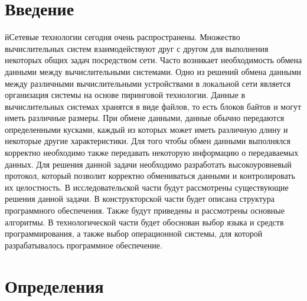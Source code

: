 \section*{Введение}
йСетевые технологии сегодня очень распространены. Множество
вычислительных систем взаимодействуют друг с другом для выполнения
некоторых общих задач посредством сети. Часто возникает необходимость
обмена данными между вычислительными системами. Одно из решений
обмена данными между различными вычислительными устройствами в
локальной сети является организация системы на основе пиринговой
технологии.
\newpar
Данные в вычислительных системах хранятся в виде файлов, то есть блоков
байтов и могут иметь различные размеры. При обмене данными, данные
обычно передаются определенными кусками, каждый из которых может
иметь различную длину и некоторые другие характеристики. Для того чтобы
обмен данными выполнялся корректно необходимо также передавать
некоторую информацию о передаваемых данных. Для решения данной задачи
необходимо разработать высокоуровневый протокол, который позволит
корректно обмениваться данными и контролировать их целостность.
\newpar
В исследовательской части будут рассмотрены существующие решения
данной задачи.
\newpar
В конструкторской части будет описана структура программного
обеспечения. Также будут приведены и рассмотрены основные алгоритмы.
\newpar
В технологической части будет обоснован выбор языка и средств
программирования, а также выбор операционной системы, для которой
разрабатывалось программное обеспечение.

\section*{Определения}

